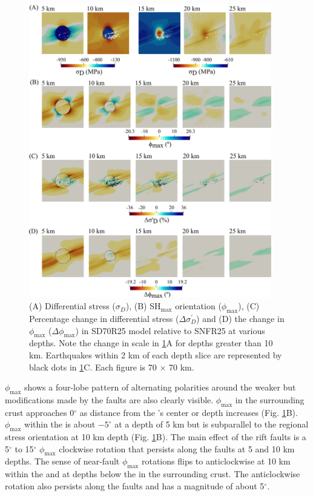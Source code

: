 \documentclass[draft]{agujournal2018}
\begin{document}
\begin{figure}[ht]
\centering
\includegraphics[width=25pc]{Figures/SD70R25_2.png}
\caption{(A) Differential stress ($\sigma_D$), (B) SH$_{\max}$ orientation ($\phi_{\max}$), (C) Percentage change in differential stress  ($\Delta\sigma_{D}^{\prime}$) and (D) the change in $\phi_{\max}$ ($\Delta\phi_{\max}$) in SD70R25 model relative to SNFR25 at various depths. Note the change in scale in \ref{fig:SD70R25}A for depths greater than 10 km. Earthquakes within 2 km of each depth slice are represented by black dots in \ref{fig:SD70R25}C.  Each figure is 70 $\times$ 70 km.} 
\label{fig:SD70R25}
\end{figure}

$\phi_{\max}$ shows a four-lobe pattern of alternating polarities around the weaker  but modifications made by the faults are also clearly visible. $\phi_{\max}$ in the surrounding crust approaches 0$^\circ$ as distance from the 's center or depth increases (Fig. \ref{fig:SD70R25}B). $\phi_{\max}$ within the  is about $-5^{\circ}$ at a depth of 5 km but is subparallel to the regional stress orientation at 10 km depth (Fig. \ref{fig:SD70R25}B). The main effect of the rift faults is a 5$^{\circ}$ to 15$^{\circ}$ $\phi_{\max}$ clockwise rotation that persists along the faults at 5 and 10 km depths. The sense of near-fault $\phi_{\max}$ rotations flips to anticlockwise at 10 km within the  and at depths below the  in the surrounding crust. The anticlockwise rotation also persists along the faults and has a magnitude of about 5$^{\circ}$.
\end{document}
